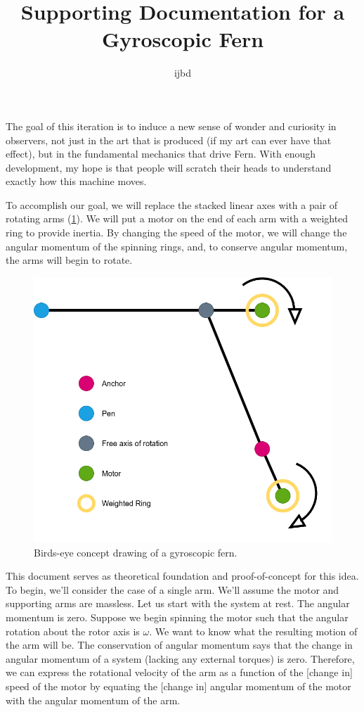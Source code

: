 \documentclass{article}
\title{Supporting Documentation for a Gyroscopic Fern}
\author{ijbd}
\begin{document}
	The goal of this iteration is to induce a new sense of wonder and curiosity in observers, 
	not just in the art that is produced (if my art can ever have that effect), but in the fundamental mechanics that drive Fern.
	With enough development, my hope is that people will scratch their heads to understand exactly how this machine moves.

	To accomplish our goal, we will replace the stacked linear axes with a pair of rotating arms (\ref{fig:high-level-concept}).
	We will put a motor on the end of each arm with a weighted ring to provide inertia.
	By changing the speed of the motor, we will change the angular momentum of the spinning rings,
	and, to conserve angular momentum, the arms will begin to rotate. 

	\begin{figure}[h!]
   		\includegraphics[width=\linewidth]{../diagrams/fern-v3-concept-diagram.png}   
		\caption{Birds-eye concept drawing of a gyroscopic fern.}
		\label{fig:high-level-concept}
	\end{figure}

	This document serves as theoretical foundation and proof-of-concept for this idea.
	To begin, we'll consider the case of a single arm.
	We'll assume the motor and supporting arms are massless.
	Let us start with the system at rest. The angular momentum is zero. 
	Suppose we begin spinning the motor such that the angular rotation about the rotor axis is $\omega$.
	We want to know what the resulting motion of the arm will be. 
	The conservation of angular momentum says that the change in angular momentum of a system (lacking any external torques)
	is zero. Therefore, we can express the rotational velocity of the arm as a function of the [change in] speed of the motor by equating
	the [change in] angular momentum of the motor with the angular momentum of the arm.
\end{document}
